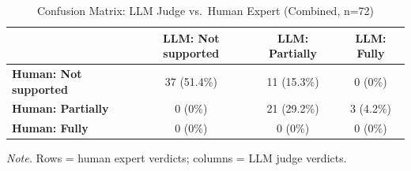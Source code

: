 \begin{table}[H]
\centering
\caption{Confusion Matrix: LLM Judge vs.\ Human Expert (Combined, n=72)}
\label{tab:human_validation_confusion}
\begin{threeparttable}
\begin{tabular}{lccc}
\toprule
 & \textbf{LLM: Not supported} & \textbf{LLM: Partially} & \textbf{LLM: Fully} \\
\midrule
\textbf{Human: Not supported} & 37 (51.4\%) & 11 (15.3\%) & 0 (0\%) \\
\textbf{Human: Partially} & 0 (0\%) & 21 (29.2\%) & 3 (4.2\%) \\
\textbf{Human: Fully} & 0 (0\%) & 0 (0\%) & 0 (0\%) \\
\bottomrule
\end{tabular}
\begin{tablenotes}
\small
\item \textit{Note.} Rows = human expert verdicts; columns = LLM judge verdicts.
\end{tablenotes}
\end{threeparttable}
\end{table}


